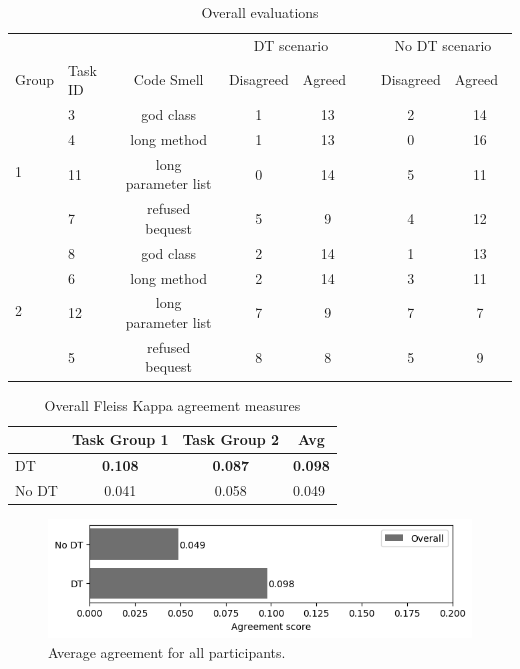 \begin{table}[ht]
\centering
\begin{tabular}{llccclcc} 
\toprule
 &  & \multicolumn{1}{l}{} & \multicolumn{2}{c}{DT scenario} & \multicolumn{1}{c}{} & \multicolumn{2}{c}{No DT scenario} \\ 
\cmidrule{4-5}\cmidrule{7-8}
Group & Task ID & Code Smell & Disagreed & Agreed~ &  & \multicolumn{1}{l}{Disagreed} & \multicolumn{1}{l}{Agreed~} \\ 
\midrule
\multirow{4}{*}{1} & 3 & god class & 1 & 13 &  & 2 & 14 \\
 & 4 & long method & 1 & 13 &  & 0 & 16 \\
 & 11 & long parameter list & 0 & 14 &  & 5 & 11 \\
 & 7 & refused bequest & 5 & 9 &  & 4 & 12 \\ 
\midrule
\multirow{4}{*}{2} & 8 & god class & 2 & 14 &  & 1 & 13 \\
 & 6 & long method & 2 & 14 &  & 3 & 11 \\
 & 12 & long parameter list & 7 & 9 &  & 7 & 7 \\
 & 5 & refused bequest & 8 & 8 &  & 5 & 9 \\
\bottomrule
\end{tabular}
\caption{Overall evaluations}
\label{tbl:overallTableAgreement}
\end{table}

\begin{table}[ht]
\centering
\setlength{\extrarowheight}{0pt}
\addtolength{\extrarowheight}{\aboverulesep}
\addtolength{\extrarowheight}{\belowrulesep}
\setlength{\aboverulesep}{0pt}
\setlength{\belowrulesep}{0pt}
\begin{tabular}{lccl} 
\toprule
 & \multicolumn{1}{l}{Task Group 1} & \multicolumn{1}{l}{Task Group 2} & \multicolumn{1}{c}{{\cellcolor[rgb]{0.753,0.753,0.753}}Avg} \\ 
\midrule
DT & \textbf{0.108 } & \textbf{0.087 } & {\cellcolor[rgb]{0.753,0.753,0.753}}\textbf{0.098}  \\
No DT & 0.041 & 0.058 & {\cellcolor[rgb]{0.753,0.753,0.753}}0.049 \\
\bottomrule
\end{tabular}
\caption{Overall Fleiss Kappa agreement measures}
\label{tbl:overallKappaValues}
\end{table}

\begin{figure}[ht]
\centering
\includegraphics[width=15cm]{figures/overallAgreement.png}
\caption{Average  agreement for all participants.}
\label{fig:averageAgreementOverall}
\end{figure}

